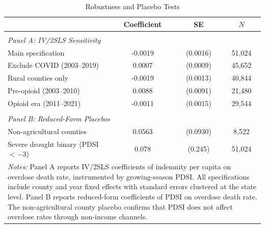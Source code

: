 \begin{table}[t]
\centering
\caption{Robustness and Placebo Tests}
\label{tab:robustness}
\begin{tabular}{lccc}
\hline\hline
 & Coefficient & SE & $N$ \\
\hline
\\[-1.8ex]
\multicolumn{4}{l}{\textit{Panel A: IV/2SLS Sensitivity}} \\[0.3ex]
Main specification & -0.0019 & (0.0016) & 51,024 \\
Exclude COVID (2003--2019) & 0.0007 & (0.0009) & 45,652 \\
Rural counties only & -0.0019 & (0.0013) & 40,844 \\
Pre-opioid (2003--2010) & 0.0088 & (0.0091) & 21,480 \\
Opioid era (2011--2021) & -0.0011 & (0.0015) & 29,544 \\
\\[-1.8ex]
\multicolumn{4}{l}{\textit{Panel B: Reduced-Form Placebos}} \\[0.3ex]
Non-agricultural counties & 0.0563 & (0.0930) & 8,522 \\
Severe drought binary (PDSI $< -3$) & 0.078 & (0.245) & 51,024 \\
\hline\hline
\multicolumn{4}{p{0.90\textwidth}}{\footnotesize \textit{Notes:}
Panel A reports IV/2SLS coefficients of indemnity per capita on overdose death
rate, instrumented by growing-season PDSI. All specifications include county and
year fixed effects with standard errors clustered at the state level. Panel B reports
reduced-form coefficients of PDSI on overdose death rate. The non-agricultural
county placebo confirms that PDSI does not affect overdose rates through non-income channels.}
\end{tabular}
\end{table}
